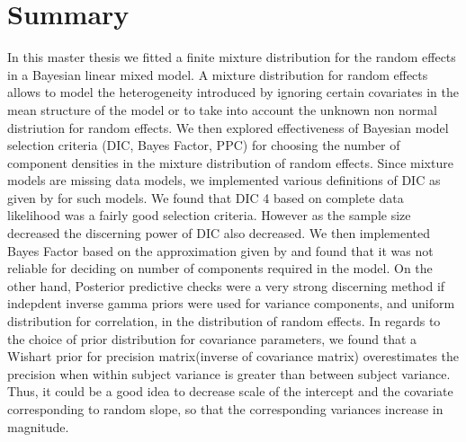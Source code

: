 
\chapter{Summary}
\label{ch : summary}

In this master thesis we fitted a finite mixture distribution for the random effects in a Bayesian linear mixed model. A mixture distribution for random effects allows to model the heterogeneity introduced by ignoring certain covariates in the mean structure of the model or to take into account the unknown non normal distriution for random effects. We then explored effectiveness of Bayesian model selection criteria (DIC, Bayes Factor, PPC) for choosing the number of component densities in the mixture distribution of random effects. Since mixture models are missing data models, we implemented various definitions of DIC as given by \citet{celeux_deviance_2006} for such models. We found that DIC 4 based on complete data likelihood was a fairly good selection criteria. However as the sample size decreased the discerning power of DIC also decreased. We then implemented Bayes Factor based on the approximation given by \citet{chib_marginal_1995} and found that it was not reliable for deciding on number of components required in the model. On the other hand, Posterior predictive checks were a very strong discerning method if indepdent inverse gamma priors were used for variance components, and uniform distribution for correlation, in the distribution of random effects. In regards to the choice of prior distribution for covariance parameters, we found that a Wishart prior for precision matrix(inverse of covariance matrix) overestimates the precision when within subject variance is greater than between subject variance. Thus, it could be a good idea to decrease scale of the intercept and the covariate corresponding to random slope, so that the corresponding variances increase in magnitude.